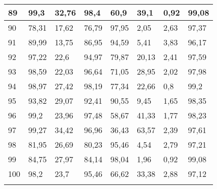 \begin{longtable}[c]{|l|l|l|l|l|l|l|l|}
89              & 99,3         & 32,76        & 98,4        & 60,9          & 39,1          & 0,92          & 99,08         \\ \hline
90              & 78,31        & 17,62        & 76,79       & 97,95         & 2,05          & 2,63          & 97,37         \\ \hline
91              & 89,99        & 13,75        & 86,95       & 94,59         & 5,41          & 3,83          & 96,17         \\ \hline
92              & 97,22        & 22,6         & 94,97       & 79,87         & 20,13         & 2,41          & 97,59         \\ \hline
93              & 98,59        & 22,03        & 96,64       & 71,05         & 28,95         & 2,02          & 97,98         \\ \hline
94              & 98,97        & 27,42        & 98,19       & 77,34         & 22,66         & 0,8           & 99,2          \\ \hline
95              & 93,82        & 29,07        & 92,41       & 90,55         & 9,45          & 1,65          & 98,35         \\ \hline
96              & 99,2         & 23,96        & 97,48       & 58,67         & 41,33         & 1,77          & 98,23         \\ \hline
97              & 99,27        & 34,42        & 96,96       & 36,43         & 63,57         & 2,39          & 97,61         \\ \hline
98              & 81,95        & 26,69        & 80,23       & 95,46         & 4,54          & 2,79          & 97,21         \\ \hline
99              & 84,75        & 27,97        & 84,14       & 98,04         & 1,96          & 0,92          & 99,08         \\ \hline
100             & 98,2         & 23,7         & 95,46       & 66,62         & 33,38         & 2,88          & 97,12         \\ \hline
\label{anx:lexhsi}
\end{longtable}
